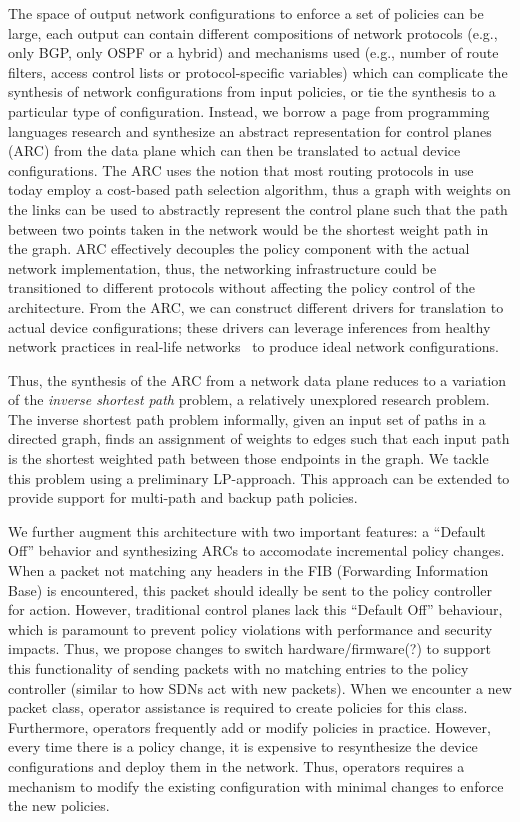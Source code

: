 The space of output network configurations to enforce a set of policies
can be large, each output can contain different compositions of 
network protocols (e.g., only BGP, only OSPF or a hybrid) and
mechanisms used (e.g., number of route filters, access control lists
or protocol-specific variables) which can complicate the synthesis of
network configurations from
input policies, or tie the synthesis to a particular type of configuration. 
Instead, we borrow a page from programming languages
research and
synthesize an abstract representation for control planes (ARC) from 
the data plane which can then be translated to actual device configurations.
The ARC uses the notion that most routing protocols in use 
today employ a cost-based path selection algorithm, thus a graph with
weights on the links can be used to abstractly represent the control plane such that 
the path between two points taken in the network would be 
the shortest weight path in the graph. 
ARC effectively decouples the policy component with the 
actual network implementation, thus, the networking infrastructure could be
transitioned to different protocols without affecting the policy 
control of the architecture. From the ARC, we can construct different
drivers for translation to actual device configurations; these drivers
can leverage inferences from healthy network practices in 
real-life networks~\cite{mpa-imc15} to produce ideal network configurations.

Thus, the synthesis of the ARC from a network data plane reduces to a
variation of the {\em inverse shortest path} problem, a relatively 
unexplored research problem. The inverse shortest path problem informally,
given an input set of paths in a directed graph, 
finds an assignment of weights to edges such that each input
path is the shortest weighted path between those endpoints in 
the graph. We tackle this problem using a preliminary 
LP-approach. This approach can be extended to provide support
for multi-path and backup path policies. 


We further augment this architecture with two important features: 
a ``Default Off'' behavior and synthesizing ARCs to
accomodate incremental policy changes. When a packet not matching any headers
in the FIB (Forwarding Information Base) is encountered, this packet 
should ideally be sent to the 
policy controller for action. However, traditional control planes lack this
``Default Off'' behaviour, which is paramount to prevent policy violations with
performance and security impacts. Thus, we propose changes to switch hardware/firmware(?) 
to support this functionality of sending packets with no matching entries to the 
policy controller (similar to how SDNs act with new packets).
When we encounter a new packet class, operator assistance is required to create policies 
for this class. Furthermore, operators frequently add or modify policies in practice. 
However, every time there is a policy change, it is expensive to resynthesize the device
configurations and deploy them in the network. Thus, 
operators requires a mechanism to modify the 
existing configuration with minimal changes to enforce the new policies.


